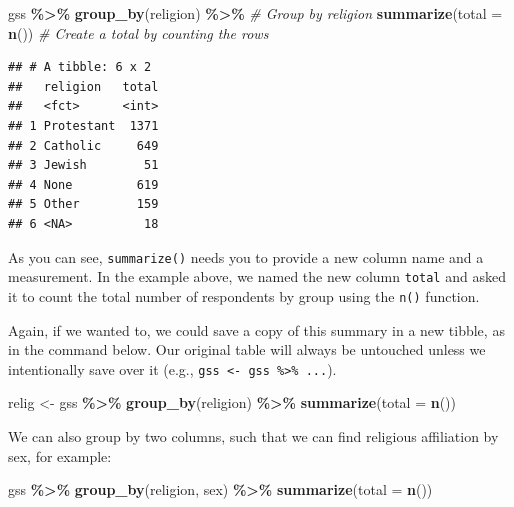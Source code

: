 \documentclass[
]{book}
\newenvironment{Shaded}{\begin{snugshade}}{\end{snugshade}}
\newcommand{\AttributeTok}[1]{\textcolor[rgb]{0.13,0.29,0.53}{#1}}
\newcommand{\CommentTok}[1]{\textcolor[rgb]{0.56,0.35,0.01}{\textit{#1}}}
\newcommand{\FunctionTok}[1]{\textcolor[rgb]{0.13,0.29,0.53}{\textbf{#1}}}
\newcommand{\NormalTok}[1]{#1}
\newcommand{\OtherTok}[1]{\textcolor[rgb]{0.56,0.35,0.01}{#1}}
\newcommand{\SpecialCharTok}[1]{\textcolor[rgb]{0.81,0.36,0.00}{\textbf{#1}}}
\begin{document}
\begin{Shaded}
\begin{Highlighting}[]
\NormalTok{gss }\SpecialCharTok{\%\textgreater{}\%}
  \FunctionTok{group\_by}\NormalTok{(religion) }\SpecialCharTok{\%\textgreater{}\%}      \CommentTok{\# Group by religion}
  \FunctionTok{summarize}\NormalTok{(}\AttributeTok{total =} \FunctionTok{n}\NormalTok{())      }\CommentTok{\# Create a total by counting the rows}
\end{Highlighting}
\end{Shaded}

\begin{verbatim}
## # A tibble: 6 x 2
##   religion   total
##   <fct>      <int>
## 1 Protestant  1371
## 2 Catholic     649
## 3 Jewish        51
## 4 None         619
## 5 Other        159
## 6 <NA>          18
\end{verbatim}

As you can see, \texttt{summarize()} needs you to provide a new column name and a measurement. In the example above, we named the new column \texttt{total} and asked it to count the total number of respondents by group using the \texttt{n()} function.

Again, if we wanted to, we could save a copy of this summary in a new tibble, as in the command below. Our original table will always be untouched unless we intentionally save over it (e.g., \texttt{gss\ \textless{}-\ gss\ \%\textgreater{}\%\ ...}).

\begin{Shaded}
\begin{Highlighting}[]
\NormalTok{relig }\OtherTok{\textless{}{-}}\NormalTok{ gss }\SpecialCharTok{\%\textgreater{}\%}
  \FunctionTok{group\_by}\NormalTok{(religion) }\SpecialCharTok{\%\textgreater{}\%}
  \FunctionTok{summarize}\NormalTok{(}\AttributeTok{total =} \FunctionTok{n}\NormalTok{())}
\end{Highlighting}
\end{Shaded}

We can also group by two columns, such that we can find religious affiliation by sex, for example:

\begin{Shaded}
\begin{Highlighting}[]
\NormalTok{gss }\SpecialCharTok{\%\textgreater{}\%}
  \FunctionTok{group\_by}\NormalTok{(religion, sex) }\SpecialCharTok{\%\textgreater{}\%}
  \FunctionTok{summarize}\NormalTok{(}\AttributeTok{total =} \FunctionTok{n}\NormalTok{())}
\end{Highlighting}
\end{Shaded}
\end{document}
